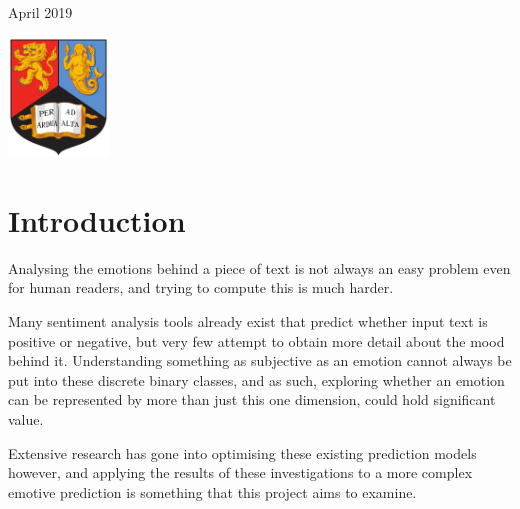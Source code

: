 \documentclass{article}
\begin{document}
\begin{titlepage}
	
	\vfill\vfill\vfill %
	
	{\large April  2019} %
	
	
	\includegraphics[width=0.2\textwidth]{litImgs/birmingham.png}\\[1cm] %
	 
	
	\vfill %
	
\end{titlepage}


\tableofcontents

\pagebreak

\section{Introduction}

Analysing the emotions behind a piece of text is not always an easy problem even for human readers, and trying to compute this is much harder.

Many sentiment analysis tools already exist that predict whether input text is positive or negative, but very few attempt to obtain more detail about the mood behind it. Understanding something as subjective as an emotion cannot always be put into these discrete binary classes, and as such, exploring whether an emotion can be represented by more than just this one dimension, could hold significant value.

Extensive research has gone into optimising these existing prediction models however, and applying the results of these investigations to a more complex emotive prediction is something that this project aims to examine.
\end{document}
